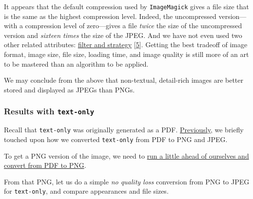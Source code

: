 \documentclass[
  a4paper,
]{article}
\begin{document}
It appears that the default compression used by \texttt{ImageMagick}
gives a file size that is the same as the highest compression level.
Indeed, the uncompressed version---with a compression level of
zero---gives a file \emph{twice} the size of the uncompressed version
and \emph{sixteen times} the size of the JPEG. And we have not even used
two other related attributes:
\href{https://stackoverflow.com/questions/27267073/imagemagick-lossless-max-compression-for-png}{filter
and strategy} {[}\protect\hyperlink{ref-setchell2014}{5}{]}. Getting the
best tradeoff of image format, image size, file size, loading time, and
image quality is still more of an art to be mastered than an algorithm
to be applied.

We may conclude from the above that non-textual, detail-rich images are
better stored and displayed as JPEGs than PNGs.

\hypertarget{results-with-text-only}{%
\subsubsection{\texorpdfstring{Results with
\texttt{text-only}}{Results with text-only}}\label{results-with-text-only}}

Recall that \texttt{text-only} was originally generated as a PDF.
\protect\hyperlink{converting-text-only-from-pdf-to-png-and-jpeg}{Previously},
we briefly touched upon how we converted \texttt{text-only} from PDF to
PNG and JPEG.

To get a PNG version of the image, we need to
\protect\hyperlink{pdf-to-png-and-jpeg-poppler-and-cairo}{run a little
ahead of ourselves and convert from PDF to PNG}.

From that PNG, let us do a simple \emph{no quality loss} conversion from
PNG to JPEG for \texttt{text-only}, and compare appearances and file
sizes.
\end{document}
